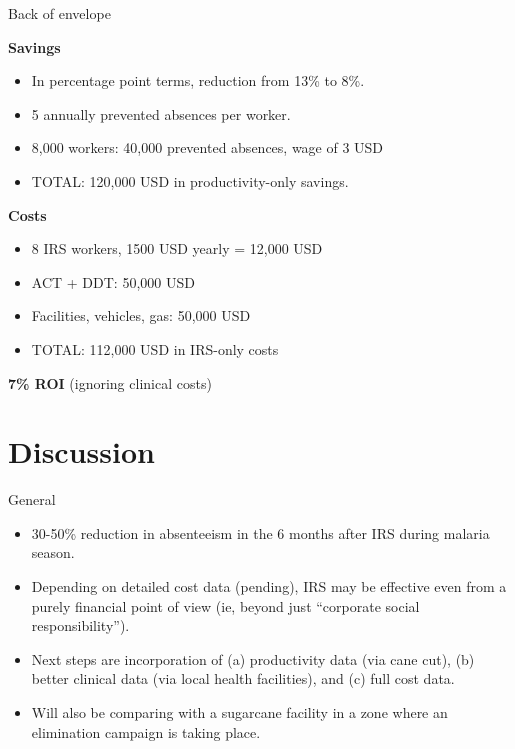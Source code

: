 \documentclass[ignorenonframetext,]{beamer}
\providecommand{\tightlist}{%
  \setlength{\itemsep}{0pt}\setlength{\parskip}{0pt}}
\begin{document}
\begin{frame}{Back of envelope}

\textbf{Savings}

\begin{itemize}
\tightlist
\item
  In percentage point terms, reduction from 13\% to 8\%.\\
\item
  5 annually prevented absences per worker.\\
\item
  8,000 workers: 40,000 prevented absences, wage of 3 USD
\item
  TOTAL: 120,000 USD in productivity-only savings.
\end{itemize}

\textbf{Costs}

\begin{itemize}
\tightlist
\item
  8 IRS workers, 1500 USD yearly = 12,000 USD\\
\item
  ACT + DDT: 50,000 USD
\item
  Facilities, vehicles, gas: 50,000 USD\\
\item
  TOTAL: 112,000 USD in IRS-only costs
\end{itemize}

\textbf{7\% ROI} (ignoring clinical costs)

\end{frame}

\section{Discussion}\label{discussion}

\begin{frame}{General}

\begin{itemize}
\tightlist
\item
  30-50\% reduction in absenteeism in the 6 months after IRS during
  malaria season.
\item
  Depending on detailed cost data (pending), IRS may be effective even
  from a purely financial point of view (ie, beyond just ``corporate
  social responsibility'').\\
\item
  Next steps are incorporation of (a) productivity data (via cane cut),
  (b) better clinical data (via local health facilities), and (c) full
  cost data.\\
\item
  Will also be comparing with a sugarcane facility in a zone where an
  elimination campaign is taking place.
\end{itemize}

\end{frame}
\end{document}
